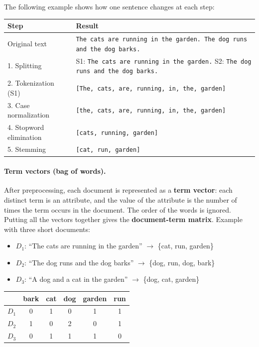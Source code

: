 The following example shows how one sentence changes at each step:

\begin{center}
    \small
    \renewcommand{\arraystretch}{1.3}
    \begin{tabular}{|l|p{7.7cm}|}
    \hline
    \textbf{Step} & \textbf{Result} \\
    \hline
    Original text & \texttt{The cats are running in the garden. The dog runs and the dog barks.} \\
    \hline
    1. Splitting & S1: \texttt{The cats are running in the garden.} \newline S2: \texttt{The dog runs and the dog barks.} \\
    \hline
    2. Tokenization (S1) & \texttt{[The, cats, are, running, in, the, garden]} \\
    \hline
    3. Case normalization & \texttt{[the, cats, are, running, in, the, garden]} \\
    \hline
    4. Stopword elimination & \texttt{[cats, running, garden]} \\
    \hline
    5. Stemming & \texttt{[cat, run, garden]} \\
    \hline
    \end{tabular}
\end{center}

\paragraph{Term vectors (bag of words).} After preprocessing, each document is represented as a \textbf{term vector}: each distinct term is an attribute, and the value of the attribute is the number of times the term occurs in the document. The order of the words is ignored. Putting all the vectors together gives the \textbf{document-term matrix}. Example with three short documents:
\begin{itemize}
    \item $D_1$: ``The cats are running in the garden'' $\rightarrow$ \{cat, run, garden\}
    \item $D_2$: ``The dog runs and the dog barks'' $\rightarrow$ \{dog, run, dog, bark\}
    \item $D_3$: ``A dog and a cat in the garden'' $\rightarrow$ \{dog, cat, garden\}
\end{itemize}

\begin{center}
    \small
    \renewcommand{\arraystretch}{1.3}
    \begin{tabular}{|l|c|c|c|c|c|}
    \hline
     & \textbf{bark} & \textbf{cat} & \textbf{dog} & \textbf{garden} & \textbf{run} \\
    \hline
    $D_1$ & 0 & 1 & 0 & 1 & 1 \\
    \hline
    $D_2$ & 1 & 0 & 2 & 0 & 1 \\
    \hline
    $D_3$ & 0 & 1 & 1 & 1 & 0 \\
    \hline
    \end{tabular}
\end{center}

